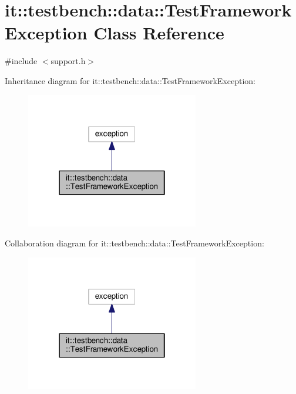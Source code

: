 \hypertarget{classit_1_1testbench_1_1data_1_1TestFrameworkException}{\section{it\-:\-:testbench\-:\-:data\-:\-:Test\-Framework\-Exception Class Reference}
\label{d4/dfe/classit_1_1testbench_1_1data_1_1TestFrameworkException}
}


{\ttfamily \#include $<$support.\-h$>$}



Inheritance diagram for it\-:\-:testbench\-:\-:data\-:\-:Test\-Framework\-Exception\-:
\nopagebreak
\begin{figure}[H]
\begin{center}
\leavevmode
\includegraphics[width=214pt]{d4/daa/classit_1_1testbench_1_1data_1_1TestFrameworkException__inherit__graph}
\end{center}
\end{figure}


Collaboration diagram for it\-:\-:testbench\-:\-:data\-:\-:Test\-Framework\-Exception\-:
\nopagebreak
\begin{figure}[H]
\begin{center}
\leavevmode
\includegraphics[width=214pt]{dd/d42/classit_1_1testbench_1_1data_1_1TestFrameworkException__coll__graph}
\end{center}
\end{figure}
